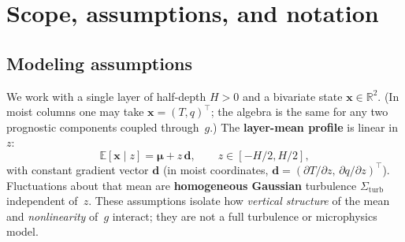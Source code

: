 \documentclass[11pt,a4paper]{article}
\begin{document}
\section{Scope, assumptions, and notation}
\label{sec:notation}

\subsection{Modeling assumptions}
We work with a single layer of half-depth $H>0$ and a bivariate state $\mathbf{x}\in\mathbb{R}^2$.
(In moist columns one may take $\mathbf{x}=(T,q)^\top$; the algebra is the same for any two prognostic components coupled through~$g$.)
The \textbf{layer-mean profile} is linear in~$z$:
\begin{equation}
  \mathbb{E}[\mathbf{x}\mid z] = \boldsymbol{\mu} + z\,\mathbf{d},
  \qquad z\in[-H/2,H/2],
\end{equation}
with constant gradient vector $\mathbf{d}$ (in moist coordinates, $\mathbf{d}=(\partial T/\partial z,\,\partial q/\partial z)^\top$).
Fluctuations about that mean are \textbf{homogeneous Gaussian} turbulence $\Sigma_{\mathrm{turb}}$ independent of~$z$.
These assumptions isolate how \emph{vertical structure} of the mean and \emph{nonlinearity} of~$g$ interact; they are not a full turbulence or microphysics model.
\end{document}
